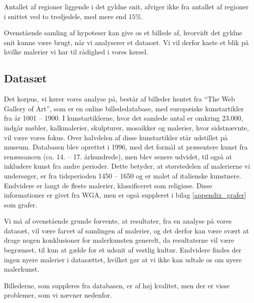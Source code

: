 {\begin{hypotese}
    Antallet af regioner liggende i det gyldne snit, afviger ikke fra
    antallet af regioner i snittet ved to tredjedele, med mere end
    $15\%$.
	\label{hypo_15p}
\end{hypotese}

Ovenstående samling af hypoteser kan give os et billede af, hvorvidt det
gyldne snit kunne være brugt, når vi analyserer et datasæt. Vi vil
derfor kaste et blik på hvilke malerier vi har til rådighed i vores
kørsel.

\subsection{Datasæt}
Det korpus, vi kører vores analyse på, består af billeder hentet fra
``The Web Gallery of Art''\cite{wgahu}, som er en online billededatabase, med
europæiske kunstartikler fra år 1001 -- 1900. I kunstartiklerne, hvor
det samlede antal er omkring 23.000, indgår møbler, kalkmalerier,
skulpturer, mosaikker og malerier, hvor sidstnævnte, vil være vores
fokus. Over halvdelen af disse kunstartikler står udstillet på museum.
Databasen blev oprettet i 1996, med det formål at præsentere kunst fra
renæssancen (ca.  14. -- 17.  århundrede), men blev senere udvidet, til
også at inkludere kunst fra andre perioder. Dette betyder, at
størstedelen af malerierne vi undersøger, er fra tidsperioden 1450 --
1650 og er malet af italienske kunstnere. Endvidere er langt de fleste
malerier, klassificeret som religiøse.  Disse informationer er givet fra
WGA, men er også suppleret i bilag \ref{appendix_grafer} som
grafer.

Vi må af ovenstående grunde forvente, at resultater, fra en analyse på
vores datasæt, vil være farvet af samlingen af malerier, og det derfor
kan være svært at drage nogen konklusioner for malerkunsten generelt, da
resultaterne vil være begrænset, til kun at gælde for et udsnit af
vestlig kultur. Endvidere findes der ingen nyere malerier i datasættet,
hvilket gør at vi ikke kan udtale os om nyere malerkunst.

Billederne, som suppleres fra databasen, er af høj kvalitet, men der er
visse problemer, som vi nævner nedenfor.

}
